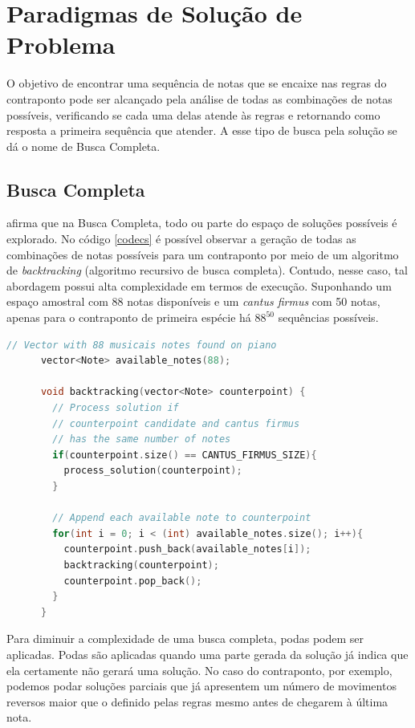   \section[Paradigmas de Solução de Problema]{Paradigmas de Solução de Problema}

    O objetivo de encontrar uma sequência de notas que se encaixe nas regras do contraponto pode ser alcançado pela análise de todas as combinações de notas possíveis, verificando se cada uma delas atende às regras e retornando como resposta a primeira sequência que atender. A esse tipo de busca pela solução se dá o nome de Busca Completa.

    \subsection[Busca Completa]{Busca Completa}

       afirma que na Busca Completa, todo ou parte do espaço de soluções possíveis é explorado. No código \ref{codecs} é possível observar a geração de todas as combinações de notas possíveis para um contraponto por meio de um algoritmo de \textit{backtracking} (algoritmo recursivo de busca completa). Contudo, nesse caso, tal abordagem possui alta complexidade em termos de execução. Suponhando um espaço amostral com 88 notas disponíveis e um \textit{cantus firmus} com 50 notas, apenas para o contraponto de primeira espécie há $88^{50}$ sequências possíveis.

      \begin{lstlisting}[language={C}, caption={Busca Completa}, label={codecs}]
      // Vector with 88 musicais notes found on piano
      vector<Note> available_notes(88);

      void backtracking(vector<Note> counterpoint) {
        // Process solution if
        // counterpoint candidate and cantus firmus
        // has the same number of notes
        if(counterpoint.size() == CANTUS_FIRMUS_SIZE){
          process_solution(counterpoint);
        }

        // Append each available note to counterpoint
        for(int i = 0; i < (int) available_notes.size(); i++){
          counterpoint.push_back(available_notes[i]);
          backtracking(counterpoint);
          counterpoint.pop_back();
        }
      }
      \end{lstlisting}

      Para diminuir a complexidade de uma busca completa, podas podem ser aplicadas. Podas são aplicadas quando uma parte gerada da solução já indica que ela certamente não gerará uma solução. No caso do contraponto, por exemplo, podemos podar soluções parciais que já apresentem um número de movimentos reversos maior que o definido pelas regras mesmo antes de chegarem à última nota.

